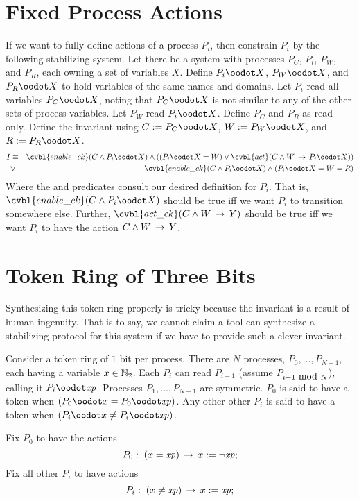 \section{Fixed Process Actions}
If we want to fully define actions of a process $P_i$, then constrain $P_i$ by the following stabilizing system.
Let there be a system with processes $P_C$, $P_i$, $P_W$, and $P_R$, each owning a set of variables $X$.
Define $P_i\oodot X$, $P_W\oodot X$, and $P_R\oodot X$ to hold variables of the same names and domains.
Let $P_i$ read all variables $P_C\oodot X$, noting that $P_C\oodot X$ is not similar to any of the other sets of process variables.
Let $P_W$ read $P_i\oodot X$.
Define $P_C$ and $P_R$ as read-only.
Define the invariant using $C\defeq P_C\oodot X$, $W\defeq P_W\oodot X$, and $R\defeq P_R\oodot X$.
\begin{eqnarray*}
I & \equiv & \cvbl{enable\_ck}(C \wedge P_i\oodot X) \wedge ((P_i\oodot X = W) \vee \cvbl{act}(C\wedge W \actxnto P_i\oodot X))
\\ & \vee & \cvbl{enable\_ck}(C \wedge P_i\oodot X) \wedge (P_i\oodot X = W = R)
\end{eqnarray*}
Where the  and  predicates consult our desired definition for $P_i$.
That is, $\cvbl{enable\_ck}(C\wedge P_i\oodot X)$ should be true iff we want $P_i$ to transition somewhere else.
Further, $\cvbl{act\_ck}(C\wedge W \actxnto Y)$ should be true iff we want $P_i$ to have the action $C \wedge W \,\to\, Y$.

\section{Token Ring of Three Bits}
Synthesizing this token ring properly is tricky because the invariant is a result of human ingenuity.
That is to say, we cannot claim a tool can synthesize a stabilizing protocol for this system if we have to provide such a clever invariant.

Consider a token ring of $1$ bit per process.
There are $N$ processes, $P_0,\dots,P_{N-1}$, each having a variable $x\in\mathbb{N}_2$.
Each $P_i$ can read $P_{i-1}$ (assume $P_{i-1\mbox{ mod }N}$), calling it $P_i\oodot \vbl{xp}$.
Processes $P_1,\dots,P_{N-1}$ are symmetric.
$P_0$ is said to have a token when $(P_0\oodot x = P_0\oodot \vbl{xp})$.
Any other other $P_i$ is said to have a token when $(P_i\oodot x \ne P_i\oodot \vbl{xp})$.

Fix $P_0$ to have the actions
\[ P_0:\; (x = \mathit{xp}) \,\to\, x:= \neg \mathit{xp}; \]
Fix all other $P_i$ to have actions
\[ P_i:\; (x \ne \mathit{xp}) \,\to\, x:= \mathit{xp}; \]


